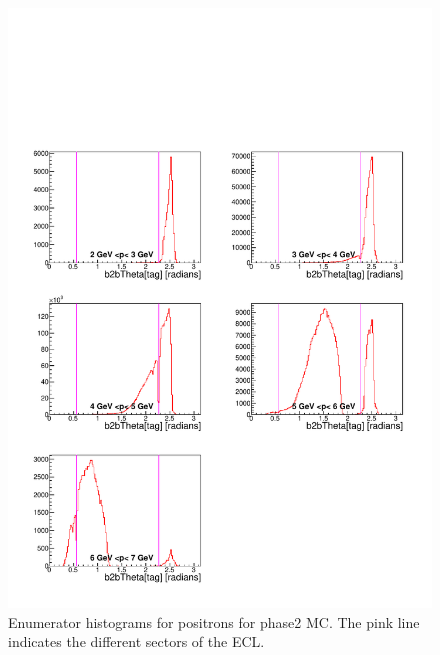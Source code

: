 \documentclass[a4paper,11pt,twosided,final,german,openbib,pdftex,listof=totoc,bibliography=totoc]{scrbook}
\begin{document}
\begin{appendix}
\begin{figure}[!htbp]
	\centering
	\includegraphics[width=\textwidth]{Plots/master/xPMThetaepE_MC}
	\caption[Momentum $\theta$ Positron Enumerator Histogram Phase2 MC]{Enumerator histograms for positrons for phase2 MC. The pink line indicates the different sectors of the ECL.}
	\label{plt:PMThetaepE_MC}
\end{figure}


\end{appendix}
\end{document}
